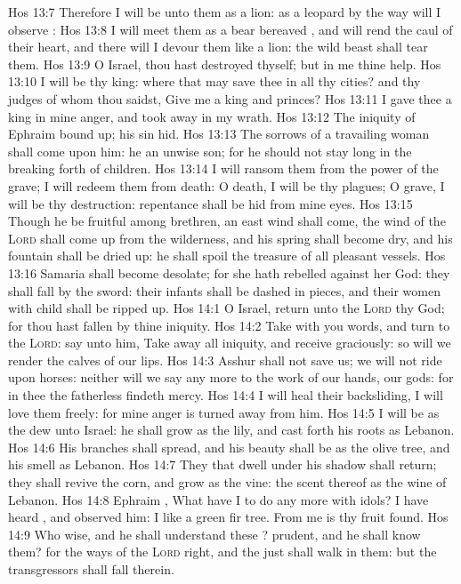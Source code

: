 \vs Hos 13:7 Therefore I will be unto them as a lion: as a leopard by the way will I observe :
\vs Hos 13:8 I will meet them as a bear  bereaved , and will rend the caul of their heart, and there will I devour them like a lion: the wild beast shall tear them.
\vs Hos 13:9 O Israel, thou hast destroyed thyself; but in me  thine help.
\vs Hos 13:10 I will be thy king: where  that may save thee in all thy cities? and thy judges of whom thou saidst, Give me a king and princes?
\vs Hos 13:11 I gave thee a king in mine anger, and took  away in my wrath.
\vs Hos 13:12 The iniquity of Ephraim  bound up; his sin  hid.
\vs Hos 13:13 The sorrows of a travailing woman shall come upon him: he  an unwise son; for he should not stay long in  the breaking forth of children.
\vs Hos 13:14 I will ransom them from the power of the grave; I will redeem them from death: O death, I will be thy plagues; O grave, I will be thy destruction: repentance shall be hid from mine eyes.
\vs Hos 13:15 Though he be fruitful among  brethren, an east wind shall come, the wind of the \textsc{Lord} shall come up from the wilderness, and his spring shall become dry, and his fountain shall be dried up: he shall spoil the treasure of all pleasant vessels.
\vs Hos 13:16 Samaria shall become desolate; for she hath rebelled against her God: they shall fall by the sword: their infants shall be dashed in pieces, and their women with child shall be ripped up.
\vs Hos 14:1 O Israel, return unto the \textsc{Lord} thy God; for thou hast fallen by thine iniquity.
\vs Hos 14:2 Take with you words, and turn to the \textsc{Lord}: say unto him, Take away all iniquity, and receive  graciously: so will we render the calves of our lips.
\vs Hos 14:3 Asshur shall not save us; we will not ride upon horses: neither will we say any more to the work of our hands,  our gods: for in thee the fatherless findeth mercy.
\vs Hos 14:4 I will heal their backsliding, I will love them freely: for mine anger is turned away from him.
\vs Hos 14:5 I will be as the dew unto Israel: he shall grow as the lily, and cast forth his roots as Lebanon.
\vs Hos 14:6 His branches shall spread, and his beauty shall be as the olive tree, and his smell as Lebanon.
\vs Hos 14:7 They that dwell under his shadow shall return; they shall revive  the corn, and grow as the vine: the scent thereof  as the wine of Lebanon.
\vs Hos 14:8 Ephraim , What have I to do any more with idols? I have heard , and observed him: I  like a green fir tree. From me is thy fruit found.
\vs Hos 14:9 Who  wise, and he shall understand these ? prudent, and he shall know them? for the ways of the \textsc{Lord}  right, and the just shall walk in them: but the transgressors shall fall therein.
